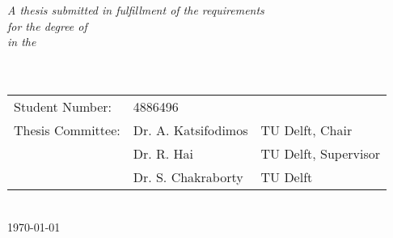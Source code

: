 \documentclass[
11pt, %
english, %
singlespacing, %
parskip, %
headsepline, %
dvipsnames]{misc/MastersDoctoralThesis} %
\theoremstyle{definition}
\begin{document}
\begin{titlepage}
\begin{center}
        \large \textit{A thesis submitted in fulfillment of the requirements\\ for the degree of \degreename}\\[0.3cm] %
        \textit{in the}\\[0.4cm]
        \groupname\\\deptname\\[2cm] %

        \vfill

        \begin{tabular}{lll}
            Student Number:   & 4886496                                    \\
            Thesis Committee: & Dr. A. Katsifodimos & TU Delft, Chair      \\
                              & Dr. R. Hai          & TU Delft, Supervisor \\
                              & Dr. S. Chakraborty  & TU Delft
        \end{tabular} \\[0.3cm]
        {\large \today}\\[4cm] %

        \vfill
    \end{center}
\end{titlepage}



\end{document}
